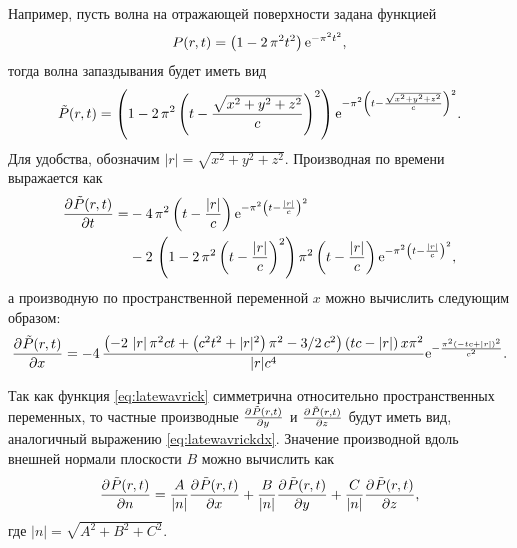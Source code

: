 \documentclass[a4paper, fontsize=14pt]{article}
\begin{document}
		Например, пусть волна на отражающей поверхности задана функцией
		\begin{equation}
			P(r,t) = \left( 1-2\,{\pi}^{2}{t}^{2} \right) {{\rm e}^{-{\pi}^{2}{t}^{2}}},
		\end{equation}
		тогда волна запаздывания будет иметь вид
		\begin{equation}
			\tilde{P}(r,t) = \left( 1-2\,{\pi}^{2} \left( t-{\frac {\sqrt {{x}^{2}+{y}^{2}+{z}^{2}
				}}{c}} \right) ^{2} \right) {{\rm e}^{-{\pi}^{2} \left( t-{\frac {
							\sqrt {{x}^{2}+{y}^{2}+{z}^{2}}}{c}} \right) ^{2}}}.
			\label{eq:latewavrick}
		\end{equation}
		Для удобства, обозначим $|r| = \sqrt{x^2+y^2+z^2}$. Производная по времени выражается как
		\begin{align}
\frac{\partial ^ {  } \tilde{P}(r,t)}{\partial t ^ {  } }=&-4\,{\pi}^{2} \left( t-{\frac { \left| r \right| }{c}} \right) {
	{\rm e}^{-{\pi}^{2} \left( t-{\frac { \left| r \right| }{c}} \right) ^
		{2}}}\nonumber\\
	&-2\, \left( 1-2\,{\pi}^{2} \left( t-{\frac { \left| r \right| }{c
}} \right) ^{2} \right) {\pi}^{2} \left( t-{\frac { \left| r \right| 
	}{c}} \right) {{\rm e}^{-{\pi}^{2} \left( t-{\frac { \left| r \right| 
			}{c}} \right) ^{2}}},
	\end{align}
	а производную по пространственной переменной $x$ можно вычислить следующим образом:
	\begin{align}
		\frac{\partial ^ {  } \tilde{P}(r,t)}{\partial x ^ {  } } = -4\,{\frac { \left( -2\, \left| r \right| {\pi}^{2}ct+ \left( {c}^{2}{
					t}^{2}+|r|^2 \right) {\pi}^{2}-3/2\,{c}^{2} \right) 
				\left( tc- \left| r \right|  \right) x{\pi}^{2}}{|r|{c}^{4}}{{\rm e}^{-{\frac {{\pi}^{2} \left( -tc+ \left| r
							\right|  \right) ^{2}}{{c}^{2}}}}}}.
	\label{eq:latewavrickdx}
	\end{align}
	
	Так как функция \ref{eq:latewavrick} симметрична относительно пространственных переменных, то частные производные $\frac{\partial ^ {  } \tilde{P}(r,t)}{\partial y ^ {  } }$ и $\frac{\partial ^ {  } \tilde{P}(r,t)}{\partial z ^ {  } }$
	будут иметь вид, аналогичный выражению \ref{eq:latewavrickdx}.  
	Значение производной вдоль внешней нормали плоскости $B$ можно вычислить как 
	\begin{equation}
		\frac{\partial ^ {  } \tilde{P}(r,t)}{\partial n ^ {  } } = \frac{A}{|n|} \frac{\partial ^ {  } \tilde{P}(r,t)}{\partial x ^ {  } } +
		  \frac{B}{|n|} \frac{\partial ^ {  } \tilde{P}(r,t)}{\partial y ^ {  } } +
		   \frac{C}{|n|} \frac{\partial ^ {  } \tilde{P}(r,t)}{\partial z ^ {  } },
	\end{equation}
	где $|n| = \sqrt{A^2+B^2+C^2}$.
\end{document}
